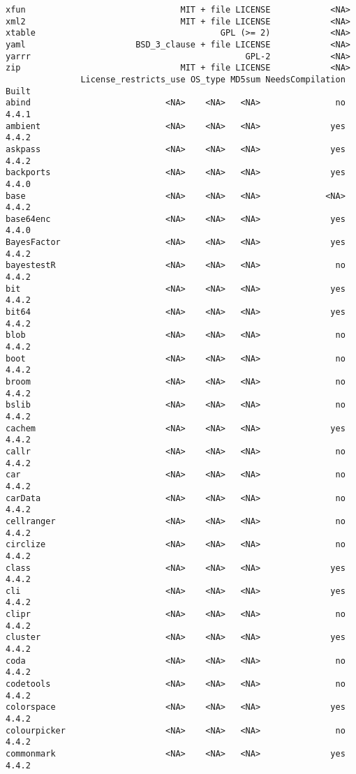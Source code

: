 \documentclass[
  letterpaper,
  DIV=11,
  numbers=noendperiod]{scrreprt}
\begin{document}
\begin{verbatim}
xfun                               MIT + file LICENSE            <NA>
xml2                               MIT + file LICENSE            <NA>
xtable                                     GPL (>= 2)            <NA>
yaml                      BSD_3_clause + file LICENSE            <NA>
yarrr                                           GPL-2            <NA>
zip                                MIT + file LICENSE            <NA>
               License_restricts_use OS_type MD5sum NeedsCompilation Built
abind                           <NA>    <NA>   <NA>               no 4.4.1
ambient                         <NA>    <NA>   <NA>              yes 4.4.2
askpass                         <NA>    <NA>   <NA>              yes 4.4.2
backports                       <NA>    <NA>   <NA>              yes 4.4.0
base                            <NA>    <NA>   <NA>             <NA> 4.4.2
base64enc                       <NA>    <NA>   <NA>              yes 4.4.0
BayesFactor                     <NA>    <NA>   <NA>              yes 4.4.2
bayestestR                      <NA>    <NA>   <NA>               no 4.4.2
bit                             <NA>    <NA>   <NA>              yes 4.4.2
bit64                           <NA>    <NA>   <NA>              yes 4.4.2
blob                            <NA>    <NA>   <NA>               no 4.4.2
boot                            <NA>    <NA>   <NA>               no 4.4.2
broom                           <NA>    <NA>   <NA>               no 4.4.2
bslib                           <NA>    <NA>   <NA>               no 4.4.2
cachem                          <NA>    <NA>   <NA>              yes 4.4.2
callr                           <NA>    <NA>   <NA>               no 4.4.2
car                             <NA>    <NA>   <NA>               no 4.4.2
carData                         <NA>    <NA>   <NA>               no 4.4.2
cellranger                      <NA>    <NA>   <NA>               no 4.4.2
circlize                        <NA>    <NA>   <NA>               no 4.4.2
class                           <NA>    <NA>   <NA>              yes 4.4.2
cli                             <NA>    <NA>   <NA>              yes 4.4.2
clipr                           <NA>    <NA>   <NA>               no 4.4.2
cluster                         <NA>    <NA>   <NA>              yes 4.4.2
coda                            <NA>    <NA>   <NA>               no 4.4.2
codetools                       <NA>    <NA>   <NA>               no 4.4.2
colorspace                      <NA>    <NA>   <NA>              yes 4.4.2
colourpicker                    <NA>    <NA>   <NA>               no 4.4.2
commonmark                      <NA>    <NA>   <NA>              yes 4.4.2

\end{verbatim}
\end{document}
